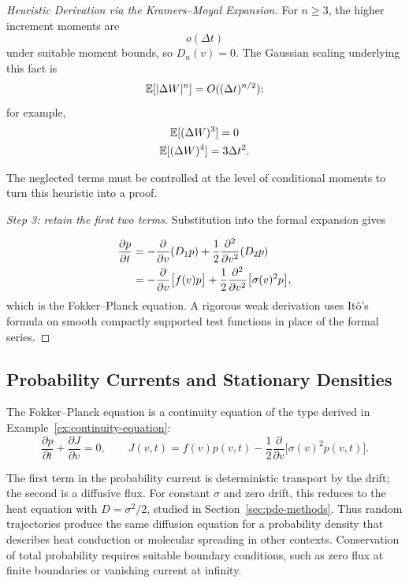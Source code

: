 \begin{proof}[Heuristic Derivation via the Kramers--Moyal Expansion]
For $n\ge3$, the higher increment moments are
\[
o(\Delta t)
\]
 under suitable moment bounds, so $D_n(v)=0$. The Gaussian scaling underlying this fact is
\[
\operatorname{\mathbb{E}}[|\Delta W|^n]=O((\Delta t)^{n/2});
\]
for example,
\[
\begin{gathered}
\operatorname{\mathbb{E}}[(\Delta W)^3]=0 \\
\operatorname{\mathbb{E}}[(\Delta W)^4]=3\Delta t^2.
\end{gathered}
\]

The neglected terms must be controlled at the level of conditional moments to turn this heuristic into a proof.

\textit{Step 3: retain the first two terms.} Substitution into the formal expansion gives

\begin{align}
\frac{\partial p}{\partial t}
&=-\frac{\partial}{\partial v}(D_1p)
+\frac12\frac{\partial^2}{\partial v^2}(D_2p)\notag\\
&=-\frac{\partial}{\partial v}\big[f(v)p\big]
+\frac12\frac{\partial^2}{\partial v^2}\big[\sigma(v)^2p\big],
\end{align}
which is the Fokker--Planck equation. A rigorous weak derivation uses It\^o's formula on smooth compactly supported test functions in place of the formal series.
\end{proof}

\subsection{Probability Currents and Stationary Densities}

\begin{remark}
The Fokker--Planck equation is a continuity equation of the type derived in Example~\ref{ex:continuity-equation}:
\begin{equation}
\frac{\partial p}{\partial t}+\frac{\partial J}{\partial v}=0,
\qquad J(v,t)=f(v)p(v,t)-\frac12\frac{\partial}{\partial v}\big[\sigma(v)^2p(v,t)\big].
\end{equation}

The first term in the probability current is deterministic transport by the drift; the second is a diffusive flux. For constant $\sigma$ and zero drift, this reduces to the heat equation with $D=\sigma^2/2$, studied in Section~\ref{sec:pde-methods}. Thus random trajectories produce the same diffusion equation for a probability density that describes heat conduction or molecular spreading in other contexts. Conservation of total probability requires suitable boundary conditions, such as zero flux at finite boundaries or vanishing current at infinity.
\end{remark}

